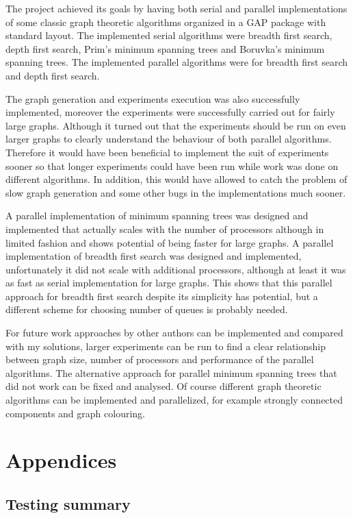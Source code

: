 \documentclass{report}
\theoremstyle{plain}
\theoremstyle{definition}
\theoremstyle{remark}
\begin{document}
The project achieved its goals by having both serial and parallel implementations of some classic graph theoretic algorithms organized in a GAP package with standard layout. The implemented serial algorithms were breadth first search, depth first search, Prim's minimum spanning trees and Boruvka's minimum spanning trees. The implemented parallel algorithms were for breadth first search and depth first search.

The graph generation and experiments execution was also successfully implemented, moreover the experiments were successfully carried out for fairly large graphs. Although it turned out that the experiments should be run on even larger graphs to clearly understand the behaviour of both parallel algorithms. Therefore it would have been beneficial to implement the suit of experiments sooner so that longer experiments could have been run while work was done on different algorithms. In addition, this would have allowed to catch the problem of slow graph generation and some other bugs in the implementations much sooner.

A parallel implementation of minimum spanning trees was designed and implemented that actually scales with the number of processors although in limited fashion and shows potential of being faster for large graphs. A parallel implementation of breadth first search was designed and implemented, unfortunately it did not scale with additional processors, although at least it was as fast as serial implementation for large graphs. This shows that this parallel approach for breadth first search despite its simplicity has potential, but a different scheme for choosing number of queues is probably needed.

For future work approaches by other authors can be implemented and compared with my solutions, larger experiments can be run to find a clear relationship between graph size, number of processors and performance of the parallel algorithms. The alternative approach for parallel minimum spanning trees that did not work can be fixed and analysed. Of course different graph theoretic algorithms can be implemented and parallelized, for example strongly connected components and graph colouring.

\chapter{Appendices}

\section{Testing summary}
\end{document}
